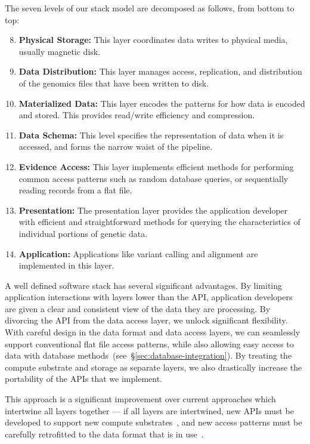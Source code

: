 \documentclass[10pt,twocolumn]{article}
\newenvironment{benumerate}[1]{
    \let\oldItem\item
    \def\item{\addtocounter{enumi}{-2}\oldItem}
    \begin{enumerate}
    \setcounter{enumi}{#1}
    \addtocounter{enumi}{1}
}{
    \end{enumerate}
}
\theoremstyle{plain}
\begin{document}
The seven levels of our stack model are decomposed as follows, from bottom to top:

\begin{benumerate} {7}
\item {\bf Physical Storage:} This layer coordinates data writes to physical media, usually magnetic disk.
\item {\bf Data Distribution:} This layer manages access, replication, and distribution of the genomics files that have been written to disk.
\item {\bf Materialized Data:} This layer encodes the patterns for how data is encoded and stored. This provides read/write efficiency
and compression.
\item {\bf Data Schema:} This level specifies the representation of data when it is accessed, and forms the narrow waist of the pipeline.
\item {\bf Evidence Access:} This layer implements efficient methods for performing common access patterns such as random database
queries, or sequentially reading records from a flat file.
\item {\bf Presentation:} The presentation layer provides the application developer with efficient and
straightforward methods for querying the characteristics of individual portions of genetic data.
\item {\bf Application:} Applications like variant calling and alignment are implemented in this layer.
\end{benumerate}

A well defined software stack has several significant advantages. By limiting application interactions with layers lower than the API,
application developers are given a clear and consistent view of the data they are processing. By divorcing the API from the data
access layer, we unlock significant flexibility. With careful design in the data format and data access layers, we can seamlessly
support conventional flat file access patterns, while also allowing easy access to data with database
methods~(see~\S\ref{sec:database-integration}). By treating the compute substrate and storage as separate layers, we also
drastically increase the portability of the APIs that we implement. 

This approach is a significant improvement over current approaches
which intertwine all layers together --- if all layers are intertwined, new APIs must be developed to support new compute
substrates~\cite{niemenmaa12}, and new access patterns must be carefully retrofitted to the data format that is in use~\cite{kozanitis13}.
\end{document}
